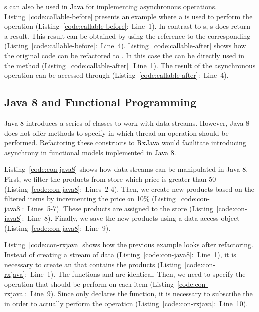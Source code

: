 \documentclass[type=bsc,accentcolor=tud9c]{tudthesis}
\newcommand{\framework}[1]{\textcolor{black}{#1}}
\begin{document}
s can also be used in \framework{Java} for implementing asynchronous operations. Listing~\ref{code:callable-before} presents an example where a  is used to perform the operation  (Listing~\ref{code:callable-before}:~Line~1). In contrast to s, s does return a result. This result can be obtained by using the reference to the corresponding  (Listing~\ref{code:callable-before}:~Line~4). Listing~\ref{code:callable-after} shows how the original code can be refactored to . In this case the  can be directly used in the  method (Listing~\ref{code:callable-after}:~Line~1). The result of the asynchronous operation can be accessed through  (Listing~\ref{code:callable-after}:~Line~4).



\subsection{Java 8 and Functional Programming}
\framework{Java 8} introduces a series of classes to work with data streams. However, \framework{Java 8} does not offer methods to specify in which thread an operation should be performed. Refactoring these constructs to \framework{RxJava} would facilitate introducing asynchrony in functional models implemented in \framework{Java 8}. 

Listing~\ref{code:con-java8} shows how data streams can be manipulated in \framework{Java 8}. First, we filter the products from store  which price is greater than 50 (Listing~\ref{code:con-java8}:~Lines~2-4). Then, we create new products based on the filtered items by incrementing the price on 10\% (Listing~\ref{code:con-java8}:~Lines~5-7). These products are assigned to the store  (Listing~\ref{code:con-java8}:~Line~8). Finally, we save the new products using a data access object (Listing~\ref{code:con-java8}:~Line~9).

Listing~\ref{code:con-rxjava} shows how the previous example looks after refactoring. Instead of creating a stream of data (Listing~\ref{code:con-java8}:~Line~1), it is necessary to create an  that contains the products (Listing~\ref{code:con-rxjava}:~Line~1). The functions  and  are identical. Then, we need to specify the operation that should be perform on each item (Listing~\ref{code:con-rxjava}:~Line~9). Since  only declares the function, it is necessary to subscribe the  in order to actually perform the operation (Listing~\ref{code:con-rxjava}:~Line~10).
\end{document}
